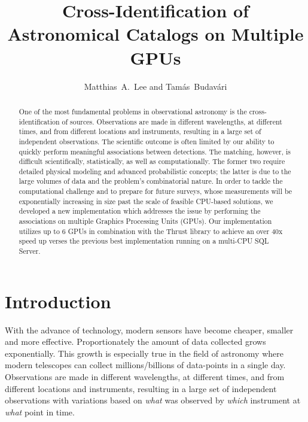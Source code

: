 \resetcounters
{}


\title{Cross-Identification of Astronomical Catalogs on Multiple GPUs}
\author{Matthias~A.~Lee and Tam\'as~Budav\'ari
}


\begin{abstract}
One of the most fundamental problems in observational astronomy is the cross-identification of sources. Observations are made in different wavelengths, at different times, and from different locations and instruments, resulting in a large set of independent observations. The scientific outcome is often limited by our ability to quickly perform meaningful associations between detections. The matching, however, is difficult scientifically, statistically, as well as computationally. The former two require detailed physical modeling and advanced probabilistic concepts; the latter is due to the large volumes of data and the problem's combinatorial nature. In order to tackle the computational challenge and to prepare for future surveys, whose measurements will be exponentially increasing in size past the scale of feasible CPU-based solutions, we developed a new implementation which addresses the issue by performing the associations on multiple Graphics Processing Units (GPUs). Our implementation utilizes up to 6 GPUs in combination with the Thrust library to achieve an over 40x speed up verses the previous best implementation running on a multi-CPU SQL Server.
\end{abstract}


\section{Introduction}
With the advance of technology, modern sensors have become cheaper, smaller and more effective. Proportionately the amount of data collected grows exponentially. This growth is especially true in the field of astronomy where modern telescopes can collect millions/billions of data-points in a single day. Observations are made in different wavelengths, at different times, and from different locations and instruments, resulting in a large set of independent observations with variations based on \textit{what} was observed by \textit{which} instrument at \textit{what} point in time.

